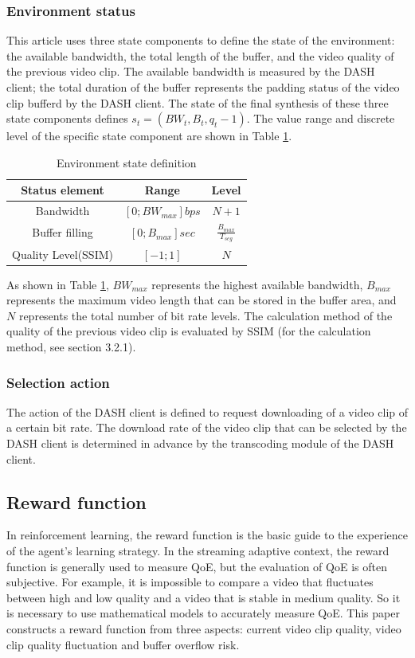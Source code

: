 \documentclass[twocolumn]{article}
\renewcommand\arraystretch{1.2}
\begin{document}
\subsubsection{Environment status}
This article uses three state components to define the state of the environment: the available bandwidth,
 the total length of the buffer, and the video quality of the previous video clip. 
 The available bandwidth is measured by the DASH client; 
 the total duration of the buffer represents the padding status of the 
 video clip bufferd by the DASH client.
 The state of the final synthesis of these three state components defines $s_t=(BW_t,B_t,q_t-1)$. 
 The value range and discrete level of the specific state component are shown in Table \ref{environment state}.
\begin{table}[h]
\centering
\renewcommand\arraystretch{0.8}
\caption{Environment state definition}
\label{environment state}
\begin{tabular}{ccc}
\toprule
Status element& Range& Level\\
\midrule
Bandwidth& $\left[0;BW_{max}\right]bps$& $N+1$\\
Buffer filling& $\left[0;B_{max}\right]sec$& $\frac{B_{max}}{T_{seg}}$\\
Quality Level(SSIM)&$\left[-1;1\right]$&$N$\\
\bottomrule
\end{tabular}
\end{table}

As shown in Table \ref{environment state}, $BW_{max}$ represents the highest available bandwidth, 
$B_{max}$ represents the maximum video length that can be stored in the buffer area,
 and $N$ represents the total number of bit rate levels. 
 The calculation method of the quality of the previous video 
 clip is evaluated by SSIM (for the calculation method, see section 3.2.1).
 \subsubsection{Selection action}
 The action of the DASH client is defined to request downloading of a video clip of a certain bit rate.
The download rate of the video clip that can be selected by the DASH client is determined in advance 
by the transcoding module of the DASH client.
\subsection{Reward function}
In reinforcement learning, the reward function is the basic guide to the experience of the agent's learning strategy. 
In the streaming adaptive context, the reward function is generally used to measure QoE, 
but the evaluation of QoE is often subjective. For example, it is impossible to compare a video 
that fluctuates between high and low quality and a video that is stable in medium quality. 
So it is necessary to use mathematical models to accurately measure QoE. 
This paper constructs a reward function from three aspects: current video clip quality, 
video clip quality fluctuation and buffer overflow risk.
\end{document}
